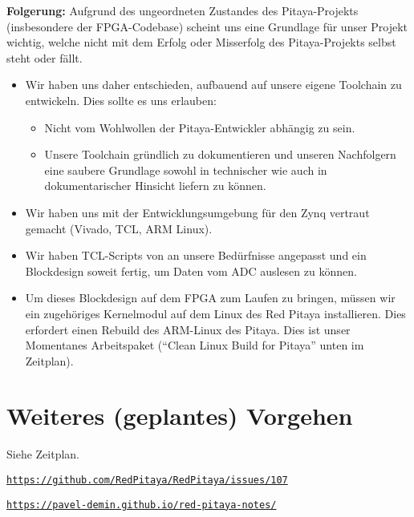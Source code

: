 \documentclass[11pt]{article}
\begin{document}
\textbf{Folgerung:} Aufgrund    des    ungeordneten    Zustandes    des
Pitaya-Projekts (insbesondere  der FPGA-Codebase)  scheint uns  eine Grundlage
f\"ur unser Projekt  wichtig, welche nicht mit dem Erfolg  oder Misserfolg des
Pitaya-Projekts selbst steht oder f\"allt.

\begin{itemize}
    \item Wir haben uns daher entschieden, aufbauend auf \cite{pavel} unsere
    eigene Toolchain zu entwickeln. Dies sollte es uns erlauben:
    \begin{itemize}
        \item Nicht  vom Wohlwollen der Pitaya-Entwickler  abh\"angig zu sein.
        \item  Unsere  Toolchain  gr\"undlich  zu  dokumentieren  und  unseren
        Nachfolgern eine saubere  Grundlage sowohl in technischer  wie auch in
        dokumentarischer Hinsicht liefern zu k\"onnen.
    \end{itemize}
    \item Wir haben uns mit der Entwicklungsumgebung f\"ur den Zynq vertraut
    gemacht (Vivado, TCL, ARM Linux).
    \item  Wir  haben TCL-Scripts  von  \cite{pavel}  an unsere  Bed\"urfnisse
    angepasst und ein Blockdesign soweit fertig,  um Daten vom ADC auslesen zu
    k\"onnen.
    \item  Um  dieses  Blockdesign  auf   dem  FPGA  zum  Laufen  zu  bringen,
    m\"ussen wir  ein zugeh\"origes Kernelmodul  auf dem Linux des  Red Pitaya
    installieren. Dies erfordert einen Rebuild  des ARM-Linux des Pitaya. Dies
    ist unser Momentanes Arbeitspaket (``Clean  Linux Build for Pitaya'' unten
    im Zeitplan).
\end{itemize}


\section{Weiteres (geplantes) Vorgehen}

Siehe Zeitplan.

\begin{thebibliography}{1}
        \href{https://github.com/RedPitaya/RedPitaya/issues/107}        
             {\nolinkurl{https://github.com/RedPitaya/RedPitaya/issues/107}}

        \href{https://pavel-demin.github.io/red-pitaya-notes/}
             {\nolinkurl{https://pavel-demin.github.io/red-pitaya-notes/}}
\end{thebibliography}


\end{document}
